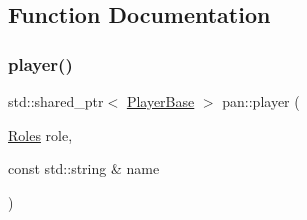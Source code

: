 \subsection{Function Documentation}
\mbox{\label{namespacepan_a9cba06f35904752ede423c15355cf307}} 
\subsubsection{\texorpdfstring{player()}{player()}}
{\footnotesize\ttfamily std\+::shared\+\_\+ptr$<$ \hyperlink{classpan_1_1_player_base}{Player\+Base} $>$ pan\+::player (\begin{DoxyParamCaption}\item[{\hyperlink{namespacepan_a5017f84fa51152eae453759537d1ced6}{Roles}}]{role,  }\item[{const std\+::string \&}]{name }\end{DoxyParamCaption})}

